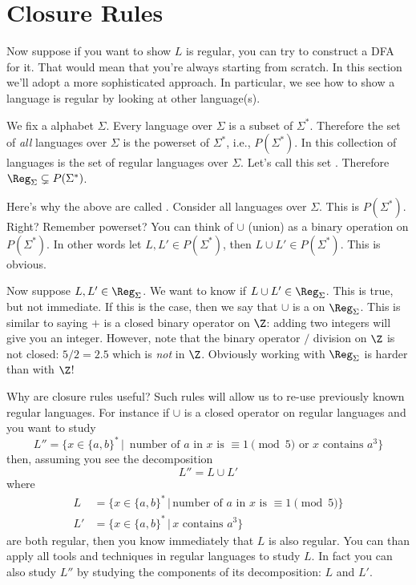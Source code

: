 \section{Closure Rules}

Now suppose if you want to show $L$ is regular, you can try to
construct a DFA for it. That would mean that you're always starting
from scratch. In this section we'll adopt a more sophisticated
approach. In particular, we see how to show a language is regular by
looking at other language(s).

We fix a alphabet $\Sigma$.
Every language over $\Sigma$ is a
subset of $\Sigma^*$. Therefore the set of
\textit{all} languages
over $\Sigma$ is the powerset of $\Sigma^*$, i.e., $P(\Sigma^*)$.
In this collection of languages is the set of regular languages
over $\Sigma$. Let's call this set . Therefore
$\Reg_\Sigma \subsetneq P(\Sigma^*)$.

Here's why the above are called . Consider all
languages over $\Sigma$. This is $P(\Sigma^*)$. Right? Remember
powerset? You can think of $\cup$ (union) as a binary operation on
$P(\Sigma^*)$. In other words let $L, L' \in P(\Sigma^*)$, then
$L \cup L' \in P(\Sigma^*)$.
This is obvious.

Now suppose $L,L' \in \Reg_\Sigma$.
We want to know if $L \cup L' \in \Reg_\Sigma$.
This is true, but not immediate.
If this is the case, then
we say that $\cup$ is a  on $\Reg_\Sigma$.
This is similar to saying $+$ is a closed binary operator on $\Z$: adding two integers
will give you an integer.
However, note that the binary operator $/$ division on $\Z$ is not closed:
$5 / 2 = 2.5$ which is \textit{not} in $\Z$.
Obviously working with $\Reg_\Sigma$ is harder than with $\Z$!

Why are closure rules useful? Such rules will allow us to re-use previously
known regular languages. For instance if $\cup$ is a closed
operator on regular languages and
you want to study
\[
  L'' = \{ x \in \{a,b\}^* \,|\, \text{ number of $a$ in $x$ is } \equiv 1 \pmod{5}
  \text{ or $x$ contains $a^3$} \}
\]
then, assuming you see the decomposition
\[
L'' = L \cup L'
\]
where
\begin{align*}
 L &= \{ x \in \{a,b\}^* \,|\, \text{number of $a$ in $x$ is } \equiv 1 \pmod{5}
 \}\\
 L' &= \{ x \in \{a,b\}^* \,|\, x \text{ contains } a^3 \}
\end{align*}
are both regular, then you know immediately that $L$ is also regular.
You can than apply all tools and techniques in regular languages to study $L$.
In fact you can also study $L''$ by studying the components of
its decomposition: $L$ and $L'$.

